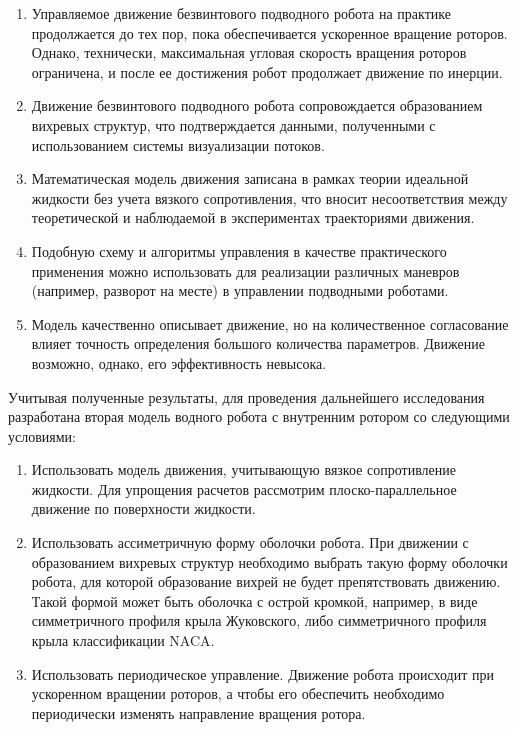\begin{enumerate}
	\item	Управляемое движение безвинтового подводного робота на практике продолжается до тех пор, пока обеспечивается ускоренное вращение роторов. Однако, технически, максимальная угловая скорость вращения роторов ограничена, и после ее достижения робот продолжает движение по инерции.
	\item	Движение безвинтового подводного робота сопровождается образованием вихревых структур, что подтверждается данными, полученными с использованием системы визуализации потоков. %
	\item Математическая модель движения записана в рамках теории идеальной жидкости без учета вязкого сопротивления, что вносит несоответствия между теоретической и наблюдаемой в экспериментах траекториями движения.
	\item Подобную схему и алгоритмы управления в качестве практического применения можно использовать для реализации различных маневров (например, разворот на месте) в управлении подводными роботами.
	\item Модель качественно описывает движение, но на количественное согласование влияет точность определения большого количества параметров. Движение возможно, однако, его эффективность невысока.
	
\end{enumerate}

Учитывая полученные результаты, для проведения дальнейшего исследования разработана вторая модель водного робота с внутренним ротором со следующими условиями:

\begin{enumerate}
	\item Использовать модель движения, учитывающую вязкое сопротивление жидкости.
	Для упрощения расчетов рассмотрим плоско-параллельное движение по поверхности жидкости.
	
	\item Использовать ассиметричную форму оболочки робота. При движении с образованием вихревых структур необходимо выбрать такую форму оболочки робота, для которой образование вихрей не будет препятствовать движению. Такой формой может быть оболочка с острой кромкой, например, в виде симметричного профиля крыла Жуковского, либо симметричного профиля крыла классификации NACA.
	
	\item Использовать периодическое управление. Движение робота происходит при ускоренном вращении роторов, а чтобы его обеспечить необходимо периодически изменять направление вращения ротора. 
	
\end{enumerate}






